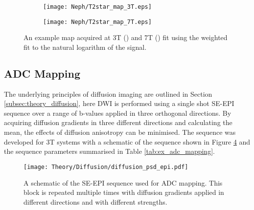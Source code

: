 \begin{figure}[H]
	\centering
	\begin{subfigure}[c]{0.47\textwidth}
		\centering
		\texttt{[image: Neph/T2star\_map\_3T.eps]}
		\caption{}
		\label{fig:ex_t2star_map_3t}
	\end{subfigure}
	\hfill
	\begin{subfigure}[c]{0.47\textwidth}
		\centering
		\texttt{[image: Neph/T2star\_map\_7T.eps]}
		\caption{}
		\label{fig:ex_t2star_map_7t}
	\end{subfigure}
	\caption{An example \ttwostar map acquired at 3T () and 7T () fit using the weighted fit to the natural logarithm of the signal.}
	\label{fig:ex_t2star_maps}
\end{figure}

\subsection{\acl*{ADC} Mapping}
\label{subsec:ex_adc}

The underlying principles of diffusion imaging are outlined in Section \ref{subsec:theory_diffusion}, here \ac{DWI} is performed using a single shot \ac{SE}-\ac{EPI} sequence over a range of b-values applied in three orthogonal directions. By acquiring diffusion gradients in three different directions and calculating the mean, the effects of diffusion anisotropy can be minimised. The sequence was developed for 3T systems with a schematic of the sequence shown in Figure \ref{fig:ex_adc_psd} and the sequence parameters summarised in Table \ref{tab:ex_adc_mapping}. 

\begin{figure}[H]
	\centering
	\texttt{[image: Theory/Diffusion/diffusion\_psd\_epi.pdf]}
	\caption{A schematic of the \ac{SE}-\ac{EPI} sequence used for \ac{ADC} mapping. This block is repeated multiple times with diffusion gradients applied in different directions and with different strengths.}
	\label{fig:ex_adc_psd}	
\end{figure}


